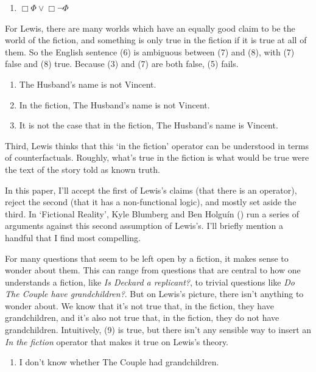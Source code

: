 \documentclass[
  11pt,
  letterpaper,
  DIV=11,
  numbers=noendperiod,
  twoside]{scrartcl}
\providecommand{\tightlist}{%
  \setlength{\itemsep}{0pt}\setlength{\parskip}{0pt}}
\begin{document}
\begin{enumerate}
\def\labelenumi{(\arabic{enumi})}
\setcounter{enumi}{4}
\tightlist
\item
  \(\Box \Phi \vee \Box \neg \Phi\)
\end{enumerate}

For Lewis, there are many worlds which have an equally good claim to be
the world of the fiction, and something is only true in the fiction if
it is true at all of them. So the English sentence (6) is ambiguous
between (7) and (8), with (7) false and (8) true. Because (3) and (7)
are both false, (5) fails.

\begin{enumerate}
\def\labelenumi{(\arabic{enumi})}
\setcounter{enumi}{5}
\tightlist
\item
  The Husband's name is not Vincent.
\item
  In the fiction, The Husband's name is not Vincent.
\item
  It is not the case that in the fiction, The Husband's name is Vincent.
\end{enumerate}

Third, Lewis thinks that this `in the fiction' operator can be
understood in terms of counterfactuals. Roughly, what's true in the
fiction is what would be true were the text of the story told as known
truth.

In this paper, I'll accept the first of Lewis's claims (that there is an
operator), reject the second (that it has a non-functional logic), and
mostly set aside the third. In `Fictional Reality', Kyle Blumberg and
Ben Holguín () run a series of
arguments against this second assumption of Lewis's. I'll briefly
mention a handful that I find most compelling.

For many questions that seem to be left open by a fiction, it makes
sense to wonder about them. This can range from questions that are
central to how one understands a fiction, like \emph{Is Deckard a
replicant?}, to trivial questions like \emph{Do The Couple have
grandchildren?}. But on Lewis's picture, there isn't anything to wonder
about. We know that it's not true that, in the fiction, they have
grandchildren, and it's also not true that, in the fiction, they do not
have grandchildren. Intuitively, (9) is true, but there isn't any
sensible way to insert an \emph{In the fiction} operator that makes it
true on Lewis's theory.

\begin{enumerate}
\def\labelenumi{(\arabic{enumi})}
\setcounter{enumi}{8}
\tightlist
\item
  I don't know whether The Couple had grandchildren.
\end{enumerate}
\end{document}
